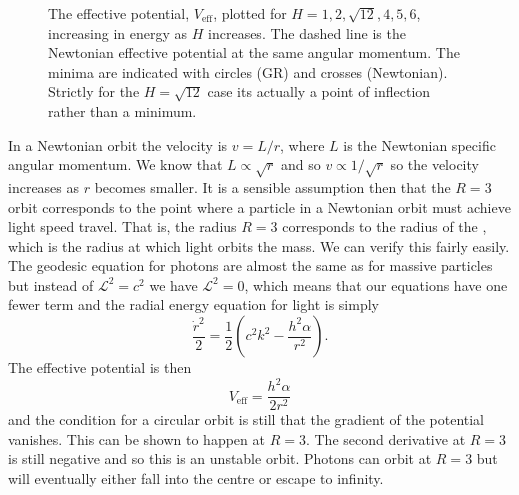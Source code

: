 \documentclass[fleqn]{NotesClass}
\newcommand*{\lagrangian}{\mathcal{L}}
\begin{document}
\begin{figure}
        \caption[Effective Schwarzschild potential.]{The effective potential, \(V_{\mathrm{eff}}\), plotted for \(H = 1, 2, \sqrt{12}, 4, 5, 6\), increasing in energy as \(H\) increases. The dashed line is the Newtonian effective potential at the same angular momentum. The minima are indicated with circles (GR) and crosses (Newtonian). Strictly for the \(H = \sqrt{12}\) case its actually a point of inflection rather than a minimum.}
        \label{fig:effective potential}
    \end{figure}
    
    In a Newtonian orbit the velocity is \(v = L/r\), where \(L\) is the Newtonian specific angular momentum.
    We know that \(L \propto \sqrt{r}\) and so \(v \propto 1/\sqrt{r}\) so the velocity increases as \(r\) becomes smaller.
    It is a sensible assumption then that the \(R = 3\) orbit corresponds to the point where a particle in a Newtonian orbit must achieve light speed travel.
    That is, the radius \(R = 3\) corresponds to the radius of the , which is the radius at which light orbits the mass.
    We can verify this fairly easily.
    The geodesic equation for photons are almost the same as for massive particles but instead of \(\lagrangian^2 = c^2\) we have \(\lagrangian^2 = 0\), which means that our equations have one fewer term and the radial energy equation for light is simply
    \begin{equation}
        \frac{\dot{r}^2}{2} = \frac{1}{2}\left( c^2k^2 - \frac{h^2\alpha}{r^2} \right).
    \end{equation}
    The effective potential is then
    \begin{equation}
        V_{\mathrm{eff}} = \frac{h^2\alpha}{2r^2}
    \end{equation}
    and the condition for a circular orbit is still that the gradient of the potential vanishes.
    This can be shown to happen at \(R = 3\).
    The second derivative at \(R = 3\) is still negative and so this is an unstable orbit.
    Photons can orbit at \(R = 3\) but will eventually either fall into the centre or escape to infinity.
    
\end{document}
